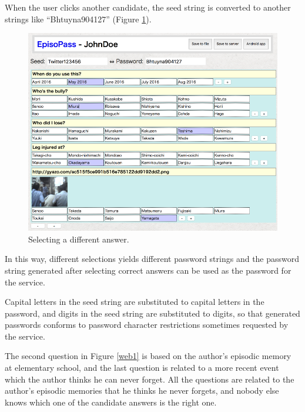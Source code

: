 \documentclass[runningheads,a4paper]{llncs}
\begin{document}
When the user clicks another candidate,
the seed string is converted to another strings like
``\textsf{Bhtuyna904127}'' (Figure \ref{web11}).

\begin{figure}[H]
\centering
\includegraphics[width=1.0\columnwidth]{figures/01e5507d090eb494a20bcbc47c86b1d2}
\caption{Selecting a different answer.}
\label{web11}
\end{figure}

In this way, different selections yields different password strings and
the password string generated after selecting correct answers can be
used as the password for the service.

Capital letters in the seed string are substituted to capital letters in the password,
and digits in the seed string are substituted to digits,
so that generated passwords conforms to password character restrictions
sometimes requested by the service.


The second question in Figure \ref{web1}
is based on the author's episodic memory at elementary school,
and the last question is related to a more recent event
which the author thinks he can never forget.
All the questions are related to the author's episodic memories
that he thinks he never forgets, and nobody else knows which one of the
candidate answers is the right one.
\end{document}
